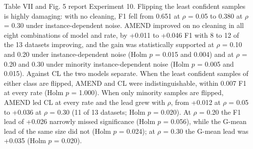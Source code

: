 \documentclass[conference]{IEEEtran}
\begin{document}
Table VII and Fig. 5 report Experiment 10. Flipping the least confident samples is highly damaging: with no cleaning, F1 fell from 0.651 at $\rho $ = 0.05 to 0.380 at $\rho $ = 0.30 under instance-dependent noise. AMEND improved on no cleaning in all eight combinations of model and rate, by +0.011 to +0.046 F1 with 8 to 12 of the 13 datasets improving, and the gain was statistically supported at $\rho $ = 0.10 and 0.20 under instance-dependent noise (Holm $p$ = 0.015 and 0.004) and at $\rho $ = 0.20 and 0.30 under minority instance-dependent noise (Holm $p$ = 0.005 and 0.015). Against CL the two models separate. When the least confident samples of either class are flipped, AMEND and CL were indistinguishable, within 0.007 F1 at every rate (Holm $p$ = 1.000). When only minority samples are flipped, AMEND led CL at every rate and the lead grew with $\rho $, from +0.012 at $\rho $ = 0.05 to +0.036 at $\rho $ = 0.30 (11 of 13 datasets; Holm $p$ = 0.020). At $\rho $ = 0.20 the F1 lead of +0.026 narrowly missed significance (Holm $p$ = 0.056), while the G-mean lead of the same size did not (Holm $p$ = 0.024); at $\rho $ = 0.30 the G-mean lead was +0.035 (Holm $p$ = 0.020).
\end{document}
